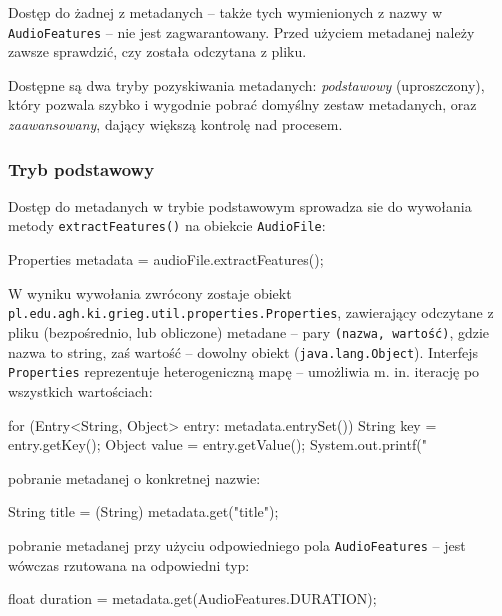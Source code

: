 \begin{Caution}
Dostęp do żadnej z metadanych -- także tych wymienionych z nazwy w \texttt{AudioFeatures} -- nie jest
zagwarantowany.  Przed użyciem metadanej należy zawsze sprawdzić, czy została odczytana z pliku.
\end{Caution}

Dostępne są dwa tryby pozyskiwania metadanych: \emph{podstawowy} (uproszczony), który pozwala szybko
i wygodnie pobrać domyślny zestaw metadanych, oraz \emph{zaawansowany}, dający większą kontrolę nad
procesem.

\subsubsection{Tryb podstawowy}


Dostęp do metadanych w trybie podstawowym sprowadza sie do wywołania metody
\texttt{extractFeatures()} na obiekcie \texttt{AudioFile}:

\begin{java}
Properties metadata = audioFile.extractFeatures();
\end{java}

W wyniku wywołania zwrócony zostaje obiekt \texttt{pl.edu.agh.ki.grieg.util.properties.Properties},
zawierający odczytane z pliku (bezpośrednio, lub obliczone) metadane -- pary \texttt{(nazwa,
wartość)}, gdzie nazwa to string, zaś wartość -- dowolny obiekt (\texttt{java.lang.Object}).
Interfejs \texttt{Properties} reprezentuje heterogeniczną mapę -- umożliwia m. in. iterację po
wszystkich wartościach:

\begin{java}
for (Entry<String, Object> entry: metadata.entrySet()) {
    String key = entry.getKey();
    Object value = entry.getValue();
    System.out.printf("%
}
\end{java}

pobranie metadanej o konkretnej nazwie:

\begin{java}
String title = (String) metadata.get("title");
\end{java}

pobranie metadanej przy użyciu odpowiedniego pola \texttt{AudioFeatures} -- jest wówczas rzutowana
na odpowiedni typ:

\begin{java}
float duration = metadata.get(AudioFeatures.DURATION);
\end{java}

